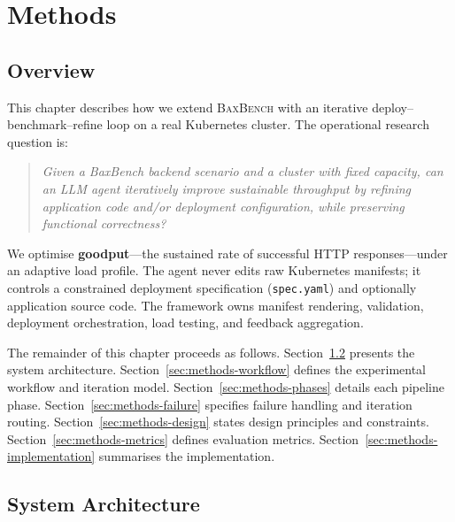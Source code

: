 
\chapter{Methods}
\label{ch:methods}


\section{Overview}
\label{sec:methods-overview}

This chapter describes how we extend \textsc{BaxBench} with an iterative
deploy--benchmark--refine loop on a real Kubernetes cluster.  The operational
research question is:

\begin{quote}
  \emph{Given a BaxBench backend scenario and a cluster with fixed capacity,
  can an LLM agent iteratively improve sustainable throughput by refining
  application code and/or deployment configuration, while preserving functional
  correctness?}
\end{quote}

We optimise \textbf{goodput}---the sustained rate of successful HTTP
responses---under an adaptive load profile.  The agent never edits raw
Kubernetes manifests; it controls a constrained deployment specification
(\texttt{spec.yaml}) and optionally application source code.  The framework
owns manifest rendering, validation, deployment orchestration, load testing,
and feedback aggregation.

The remainder of this chapter proceeds as follows.
Section~\ref{sec:methods-architecture} presents the system architecture.
Section~\ref{sec:methods-workflow} defines the experimental workflow and
iteration model.
Section~\ref{sec:methods-phases} details each pipeline phase.
Section~\ref{sec:methods-failure} specifies failure handling and iteration
routing.
Section~\ref{sec:methods-design} states design principles and constraints.
Section~\ref{sec:methods-metrics} defines evaluation metrics.
Section~\ref{sec:methods-implementation} summarises the implementation.


\section{System Architecture}
\label{sec:methods-architecture}

